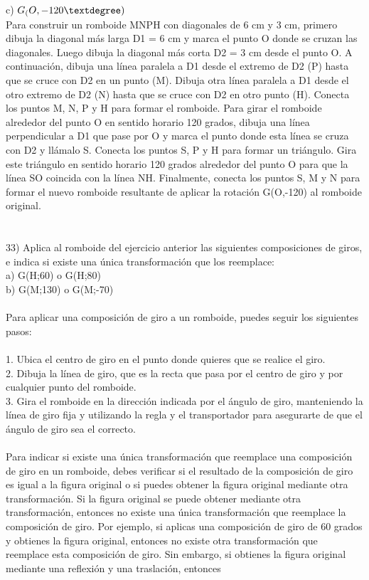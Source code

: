 \documentclass{article}
\begin{document}
c) $G_(O,-120\textdegree)$ \\
Para construir un romboide MNPH con diagonales de 6 cm y 3 cm, primero dibuja la diagonal más larga D1 = 6 cm y marca el punto O donde se cruzan las diagonales. Luego dibuja la diagonal más corta D2 = 3 cm desde el punto O.   A continuación, dibuja una línea paralela a D1 desde el extremo de D2 (P) hasta que se cruce con D2 en un punto (M). Dibuja otra línea paralela a D1 desde el otro extremo de D2 (N) hasta que se cruce con D2 en otro punto (H).   Conecta los puntos M, N, P y H para formar el romboide.   Para girar el romboide alrededor del punto O en sentido horario 120 grados, dibuja una línea perpendicular a D1 que pase por O y marca el punto donde esta línea se cruza con D2 y llámalo S.   Conecta los puntos S, P y H para formar un triángulo. Gira este triángulo en sentido horario 120 grados alrededor del punto O para que la línea SO coincida con la línea NH.   Finalmente, conecta los puntos S, M y N para formar el nuevo romboide resultante de aplicar la rotación G(O,-120) al romboide original.\\
\\
\\
33) Aplica al romboide del ejercicio anterior las siguientes composiciones de giros, e indica si existe una única transformación que los reemplace:\\
a) G(H;60) o G(H;80)   \\
b) G(M;130) o G(M;-70) \\
\\
Para aplicar una composición de giro a un romboide, puedes seguir los siguientes pasos:\\
\\
1. Ubica el centro de giro en el punto donde quieres que se realice el giro.\\
2. Dibuja la línea de giro, que es la recta que pasa por el centro de giro y por cualquier punto del romboide.\\
3. Gira el romboide en la dirección indicada por el ángulo de giro, manteniendo la línea de giro fija y utilizando la regla y el transportador para asegurarte de que el ángulo de giro sea el correcto.\\
\\
Para indicar si existe una única transformación que reemplace una composición de giro en un romboide, debes verificar si el resultado de la composición de giro es igual a la figura original o si puedes obtener la figura original mediante otra transformación. Si la figura original se puede obtener mediante otra transformación, entonces no existe una única transformación que reemplace la composición de giro. Por ejemplo, si aplicas una composición de giro de 60 grados y obtienes la figura original, entonces no existe otra transformación que reemplace esta composición de giro. Sin embargo, si obtienes la figura original mediante una reflexión y una traslación, entonces\\
\end{document}
